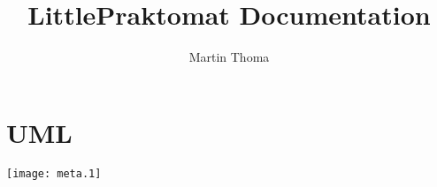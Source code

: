 \documentclass[a4paper]{article}
\title{LittlePraktomat Documentation}
\author{Martin Thoma}
\begin{document}
\maketitle

\section{UML}
\texttt{[image: meta.1]}
\end{document}
